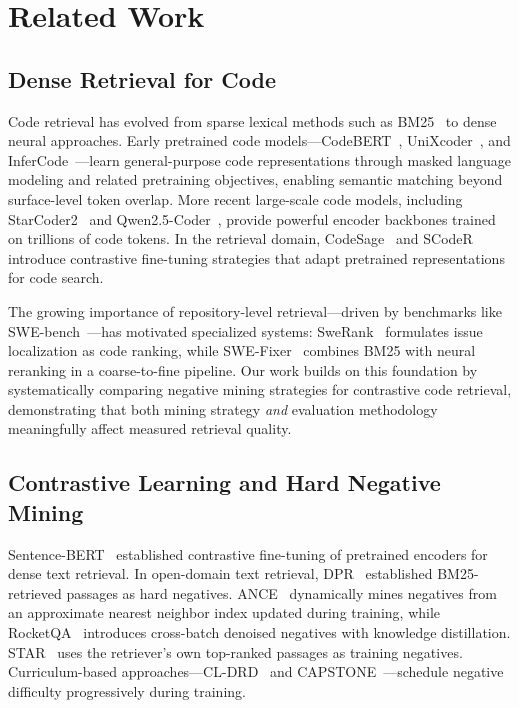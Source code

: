 \section{Related Work}
\label{sec:related}

\subsection{Dense Retrieval for Code}
\label{sec:related-retrieval}

Code retrieval has evolved from sparse lexical methods such as BM25~\cite{robertson2009bm25} to dense neural approaches.
Early pretrained code models---CodeBERT~\cite{feng2020codebert}, UniXcoder~\cite{guo2022unixcoder}, and InferCode~\cite{bui2021infercode}---learn general-purpose code representations through masked language modeling and related pretraining objectives, enabling semantic matching beyond surface-level token overlap.
More recent large-scale code models, including StarCoder2~\cite{lozhkov2024starcoder2} and Qwen2.5-Coder~\cite{hui2024qwen25coder}, provide powerful encoder backbones trained on trillions of code tokens.
In the retrieval domain, CodeSage~\cite{zhang2024codesage} and SCodeR~\cite{li2022scoder} introduce contrastive fine-tuning strategies that adapt pretrained representations for code search.

The growing importance of repository-level retrieval---driven by benchmarks like SWE-bench~\cite{jimenez2024swebench}---has motivated specialized systems: SweRank~\cite{reddy2025swerank} formulates issue localization as code ranking, while SWE-Fixer~\cite{xie2025swefixer} combines BM25 with neural reranking in a coarse-to-fine pipeline.
Our work builds on this foundation by systematically comparing negative mining strategies for contrastive code retrieval, demonstrating that both mining strategy \emph{and} evaluation methodology meaningfully affect measured retrieval quality.

\subsection{Contrastive Learning and Hard Negative Mining}
\label{sec:related-mining}

Sentence-BERT~\cite{reimers2019sentencebert} established contrastive fine-tuning of pretrained encoders for dense text retrieval.
In open-domain text retrieval, DPR~\cite{karpukhin2020dpr} established BM25-retrieved passages as hard negatives.
ANCE~\cite{xiong2021ance} dynamically mines negatives from an approximate nearest neighbor index updated during training, while RocketQA~\cite{qu2021rocketqa} introduces cross-batch denoised negatives with knowledge distillation.
STAR~\cite{zhan2021star} uses the retriever's own top-ranked passages as training negatives.
Curriculum-based approaches---CL-DRD~\cite{zeng2022cldrd} and CAPSTONE~\cite{he2023capstone}---schedule negative difficulty progressively during training.

